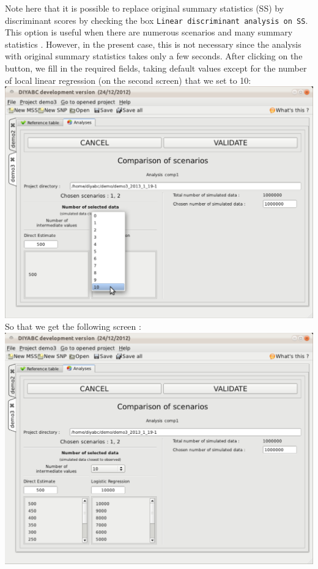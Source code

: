 Note here that it is possible to replace original summary statistics (SS) by discriminant scores by checking the box \texttt{Linear discriminant analysis on SS}. This option is useful when there are numerous scenarios and many summary statistics \citep{EL2012}. However, in the present case, this is not necessary since the analysis with original summary statistics takes only a few seconds. After clicking on the  button, we fill in the required fields, taking default values except for the number of local linear regression (on the second screen) that we set to 10:\\

\includegraphics[scale=0.3]{gui_pictures/Capture-DIYABC-109.png} \\

So that we get the following screen :\\

\includegraphics[scale=0.3]{gui_pictures/Capture-DIYABC-110.png} \\

